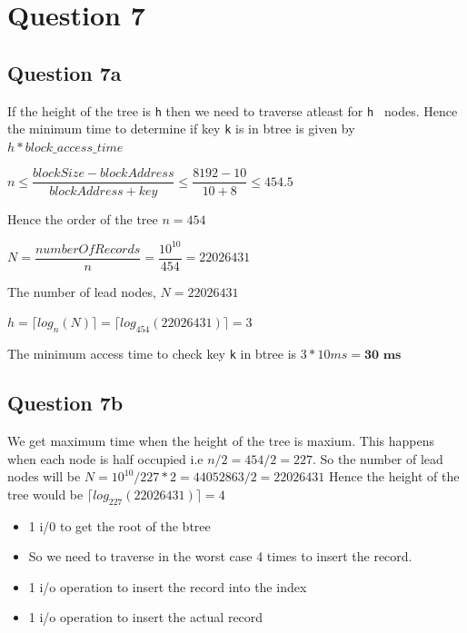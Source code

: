 \documentclass{article}
\begin{document}
  \section*{Question 7}
  \subsection*{Question 7a}
  If the height of the tree is {\tt h} then we need to traverse atleast for {\tt h } nodes. 
  Hence the minimum time to determine if key {\tt k} is in btree is given by $ h * block\_access\_time$
  \newline
  \newline
  \begin{center}
  $n \leq \dfrac{blockSize - blockAddress}{blockAddress + key} \leq \dfrac{8192 - 10}{10 + 8} \leq 454.5$
  \end{center}
  Hence the order of the tree $ n = 454$ 
  \newline
  \begin{center}
    $N = \dfrac{numberOfRecords}{n} = \dfrac{10^{10}}{454} = 22026431$
  \end{center}
  The number of lead nodes, $N = 22026431$
  \newline
  \begin{center}
    \begin{math}
      h = \lceil log_n(N) \rceil = \lceil log_{454}(22026431) \rceil = 3
    \end{math}
  \end{center}
  The minimum access time to check key {\tt k} in btree is $3 * 10ms = \textbf{30 ms}$

  \subsection*{Question 7b}

  We get maximum time when the height of the tree is maxium. This happens when each node is half occupied i.e $n / 2 = 454 / 2 = 227$.
  So the number of lead nodes will be $ N = 10^{10} / 227 * 2 = 44052863 / 2 = 22026431$
  \newline
  Hence the height of the tree would be $\lceil log_{227}(22026431) \rceil = 4$
  \newline
  \begin{itemize}
  \item 1 i/0 to get the root of the btree
  \item So we need to traverse in the worst case 4 times to insert the record.
  \item 1 i/o operation to insert the record into the index
  \item 1 i/o operation to insert the actual record
  \end{itemize}
\end{document}
